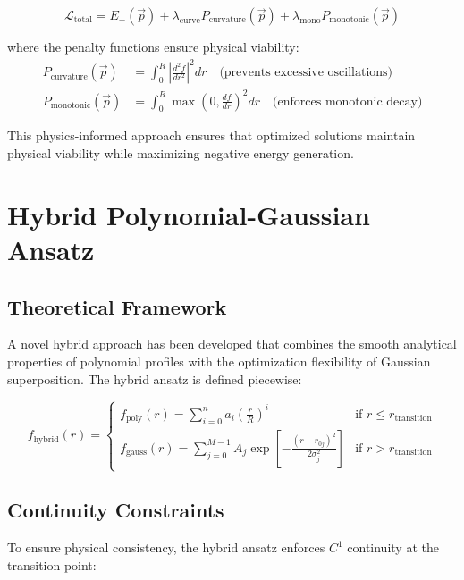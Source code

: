 \documentclass[12pt,a4paper]{article}
\begin{document}
\begin{equation}
\mathcal{L}_{\text{total}} = E_-(\vec{p}) + \lambda_{\text{curve}} P_{\text{curvature}}(\vec{p}) + \lambda_{\text{mono}} P_{\text{monotonic}}(\vec{p})
\end{equation}

where the penalty functions ensure physical viability:
\begin{align}
P_{\text{curvature}}(\vec{p}) &= \int_0^R \left|\frac{d^2f}{dr^2}\right|^2 dr \quad \text{(prevents excessive oscillations)} \\
P_{\text{monotonic}}(\vec{p}) &= \int_0^R \max\left(0, \frac{df}{dr}\right)^2 dr \quad \text{(enforces monotonic decay)}
\end{align}

This physics-informed approach ensures that optimized solutions maintain physical viability while maximizing negative energy generation.

\section{Hybrid Polynomial-Gaussian Ansatz}
\label{sec:hybrid_ansatz}

\subsection{Theoretical Framework}

A novel hybrid approach has been developed that combines the smooth analytical properties of polynomial profiles with the optimization flexibility of Gaussian superposition. The hybrid ansatz is defined piecewise:

\begin{equation}
f_{\text{hybrid}}(r) = \begin{cases}
f_{\text{poly}}(r) = \sum_{i=0}^n a_i \left(\frac{r}{R}\right)^i & \text{if } r \leq r_{\text{transition}} \\
f_{\text{gauss}}(r) = \sum_{j=0}^{M-1} A_j \exp\left[-\frac{(r - r_{0j})^2}{2\sigma_j^2}\right] & \text{if } r > r_{\text{transition}}
\end{cases}
\end{equation}

\subsection{Continuity Constraints}

To ensure physical consistency, the hybrid ansatz enforces $C^1$ continuity at the transition point:
\end{document}
